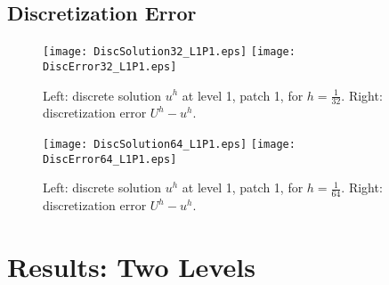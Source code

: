 \documentclass[12pt]{article}
\begin{document}
\subsection{Discretization Error}

\begin{figure}[htbp]
\begin{center}
\texttt{[image: DiscSolution32\_L1P1.eps]}
\texttt{[image: DiscError32\_L1P1.eps]}
\end{center}
\caption{Left: discrete solution $u^h$ at level 1, patch 1, for
$h = \frac{1}{32}$. Right: discretization error $U^h-u^h$.}
\label{solution32}
\end{figure}  

\begin{figure}[htbp]
\begin{center}
\texttt{[image: DiscSolution64\_L1P1.eps]}
\texttt{[image: DiscError64\_L1P1.eps]}
\end{center}
\caption{Left: discrete solution $u^h$ at level 1, patch 1, for
$h = \frac{1}{64}$. Right: discretization error $U^h-u^h$.}
\label{solution64}
\end{figure}  



\newpage
\section{Results: Two Levels}
\label{Results2}


\end{document}
